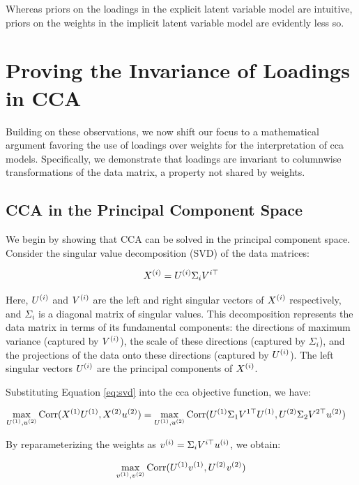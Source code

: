 Whereas priors on the loadings in the explicit latent variable model are intuitive, priors on the weights in the implicit latent variable model are evidently less so.

\section{Proving the Invariance of Loadings in CCA}

Building on these observations, we now shift our focus to a mathematical argument favoring the use of \gls{loadings} over weights for the interpretation of \acrshort{cca} models.
Specifically, we demonstrate that \gls{loadings} are invariant to columnwise transformations of the data matrix, a property not shared by weights.
\subsection{CCA in the Principal Component Space}
We begin by showing that CCA can be solved in the principal component space. Consider the singular value decomposition (SVD) of the data matrices:

\begin{align}
    X^{(i)} = U^{(i)}\Sigma_{i}V^{i\top} \label{eq:svd}
\end{align}

Here, $U^{(i)}$ and $V^{(i)}$ are the left and right singular vectors of $X^{(i)}$ respectively, and $\Sigma_{i}$ is a diagonal matrix of singular values. This decomposition represents the data matrix in terms of its fundamental components: the directions of maximum variance (captured by $V^{(i)}$), the scale of these directions (captured by $\Sigma_{i}$), and the projections of the data onto these directions (captured by $U^{(i)}$). The left singular vectors $U^{(i)}$ are the principal components of $X^{(i)}$.

Substituting Equation \ref{eq:svd} into the \acrshort{cca} objective function, we have:

\begin{align}
\max_{U^{(1)}, u^{(2)}} \operatorname{Corr}(X^{(1)}U^{(1)}, X^{(2)}u^{(2)}) &= \max_{U^{(1)}, u^{(2)}} \operatorname{Corr}(U^{(1)}\Sigma_{1}V^{1\top}U^{(1)}, U^{(2)}\Sigma_{2}V^{2\top}u^{(2)}) \label{eq:cca_obj}
\end{align}

By reparameterizing the weights as $v^{(i)} = \Sigma_{i}V^{i\top}u^{(i)}$, we obtain:

\begin{align}
\max_{v^{(1)}, v^{(2)}} \operatorname{Corr}(U^{(1)}v^{(1)}, U^{(2)}v^{(2)}) \label{eq:reparam}
\end{align}

